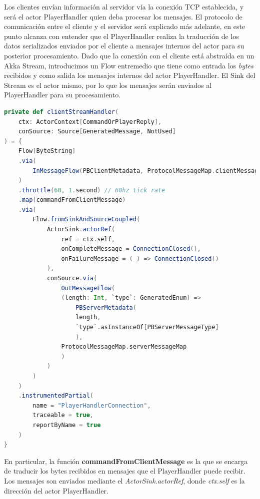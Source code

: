 Los clientes envían información al servidor vía la conexión TCP establecida, y será el actor PlayerHandler quien deba procesar
los mensajes. El protocolo de comunicación entre el cliente y el servidor será explicado más adelante, en este punto alcanza con entender
que el PlayerHandler realiza la traducción de los datos serializados enviados por el cliente a mensajes internos del actor para su posterior
procesamiento. Dado que la conexión con el cliente está abstraída en un Akka Stream, introducimos un Flow entremedio que tiene como entrada
los \textit{bytes} recibidos y como salida los mensajes internos del actor PlayerHandler. El Sink del Stream es el actor mismo,
por lo que los mensajes serán enviados al PlayerHandler para su procesamiento.

\begin{lstlisting}[language=Scala, caption={\textbf{Stream de conexión del cliente}}]
private def clientStreamHandler(
    ctx: ActorContext[CommandOrPlayerReply],
    conSource: Source[GeneratedMessage, NotUsed]
) = {
    Flow[ByteString]
    .via(
        InMessageFlow(PBClientMetadata, ProtocolMessageMap.clientMessageMap)
    )
    .throttle(60, 1.second) // 60hz tick rate
    .map(commandFromClientMessage)
    .via(
        Flow.fromSinkAndSourceCoupled(
            ActorSink.actorRef(
                ref = ctx.self,
                onCompleteMessage = ConnectionClosed(),
                onFailureMessage = (_) => ConnectionClosed()
            ),
            conSource.via(
                OutMessageFlow(
                (length: Int, `type`: GeneratedEnum) =>
                    PBServerMetadata(
                    length,
                    `type`.asInstanceOf[PBServerMessageType]
                    ),
                ProtocolMessageMap.serverMessageMap
                )
            )
        )
    )
    .instrumentedPartial(
        name = "PlayerHandlerConnection",
        traceable = true,
        reportByName = true
    )
}
\end{lstlisting}

En particular, la función \textbf{commandFromClientMessage} es la que se encarga de traducir los bytes recibidos
en mensajes que el PlayerHandler puede recibir. Los mensajes son enviados mediante el \textit{ActorSink.actorRef}, donde
\textit{ctx.self} es la dirección del actor PlayerHandler.

